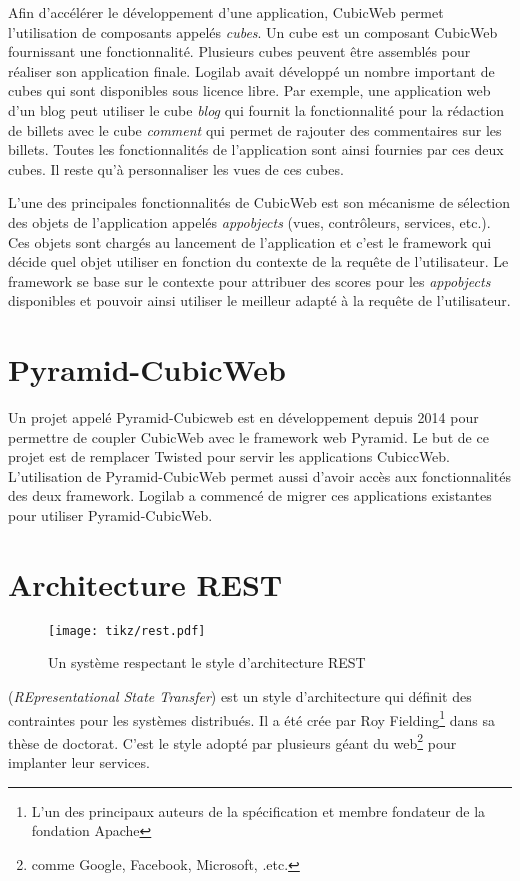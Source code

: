 Afin d'accélérer le développement d'une application, CubicWeb permet l'utilisation de composants appelés \emph{cubes}. Un cube est un composant CubicWeb fournissant une fonctionnalité. Plusieurs cubes peuvent être assemblés pour réaliser son application finale. Logilab avait développé un nombre important de cubes qui sont disponibles sous licence libre. Par exemple, une application web d'un blog peut utiliser le cube \textit{blog} qui fournit la fonctionnalité pour la rédaction de billets avec le cube \textit{comment} qui permet de rajouter des commentaires sur les billets. Toutes les fonctionnalités de l'application sont ainsi fournies par ces deux cubes. Il reste qu'à personnaliser les vues de ces cubes.

L'une des principales fonctionnalités de CubicWeb est son mécanisme de sélection des objets de l'application appelés \textit{appobjects} (vues, contrôleurs, services, etc.). Ces objets sont chargés au lancement de l'application et c'est le framework qui décide quel objet utiliser en fonction du contexte de la requête de l'utilisateur. Le framework se base sur le contexte pour attribuer des scores pour les \textit{appobjects} disponibles et pouvoir ainsi utiliser le meilleur adapté à la requête de l'utilisateur.  

\section{Pyramid-CubicWeb}
Un projet appelé Pyramid-Cubicweb est en développement depuis 2014 pour permettre de coupler CubicWeb avec le framework web Pyramid. Le but de ce projet est de remplacer Twisted pour servir les applications CubiccWeb. L'utilisation de Pyramid-CubicWeb permet aussi d'avoir accès aux fonctionnalités des deux framework. Logilab a commencé de migrer ces applications existantes pour utiliser Pyramid-CubicWeb.
 
\section{Architecture REST}
\begin{figure}
\centering
  \texttt{[image: tikz/rest.pdf]}
  \caption{Un système respectant le style d'architecture REST}
  \label{fig:rest}
\end{figure}
 (\textit{REpresentational State Transfer}) est un style d'architecture qui définit des contraintes pour les systèmes  distribués. Il a été crée par Roy Fielding\footnote{L’un des principaux auteurs de la spécification  et membre fondateur de la fondation Apache} dans sa thèse de doctorat\cite{restthesise}. C'est le style adopté par plusieurs géant du web\footnote{comme Google, Facebook, Microsoft, .etc.} pour implanter leur services. 

